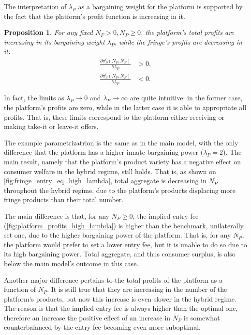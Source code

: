 \documentclass[a4paper]{article}
\newtheorem{proposition}{Proposition}
\begin{document}
The interpretation of $\lambda_P$ as a bargaining weight for the platform is supported by the fact that the platform's profit function is increasing in it.
\begin{proposition}
    \label{prop:lambda_P_comparative}
    For any fixed $N_F >0, N_P \geq 0$, the platform's total profits are increasing in its bargaining weight $\lambda_P$, while the fringe's profits are decreasing in it:
    \begin{align*}
        \frac{\partial \pi_P^t(N_P, N_F)}{\partial \lambda_P} &> 0, \\
        \frac{\partial \pi_F^t(N_P, N_F)}{\partial \lambda_P} &< 0.
    \end{align*}
\end{proposition}
In fact, the limits as $\lambda_P \to 0$ and $\lambda_P \to \infty$ are quite intuitive: in the former case, the platform's profits are zero, while in the latter case it is able to appropriate all profits.
That is, these limits correspond to the platform either receiving or making take-it or leave-it offers.

The example parametrizatrion is the same as in the main model, with the only difference that the platform has a higher innate bargaining power ($\lambda_P = 2$).
The main result, namely that the platform's product variety has a negative effect on consumer welfare in the hybrid regime, still holds.
That is, as shown on \cref{fig:fringe_entry_eq_high_lambda}, total aggregate is decreasing in $N_P$ throughout the hybrid regime, due to the platform's products displacing more fringe products than their total number.

The main difference is that, for any $N_P\geq 0$, the implied entry fee (\cref{fig:platform_profits_high_lambda}) is higher than the benchmark, unilaterally set one,  due to the higher bargaining power of the platform.
That is, for any $N_P$, the platform would prefer to set a lower entry fee, but it is unable to do so due to its high bargaining power.
Total aggregate, and thus consumer surplus, is also below the main model's outcome in this case.

Another major difference pertains to the total profits of the platform as a function of $N_P$.
It is still true that they are increasing in the number of the platform's products, but now this increase is even slower in the hybrid regime.
The reason is that the implied entry fee is always higher than the optimal one, therefore an increase the positive effect of an increase in $N_P$ is somewhat counterbalanced by the entry fee becoming even more suboptimal.
\end{document}
